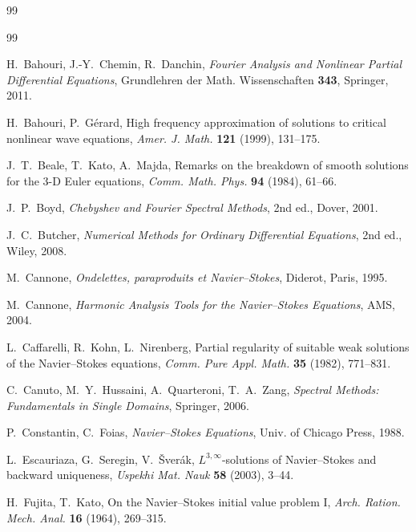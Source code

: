 \IfFileExists{nyjm.cls}{\documentclass[11pt]{nyjm}}{\documentclass[11pt]{amsart}}
\theoremstyle{plain}
\theoremstyle{definition}
\theoremstyle{remark}
\begin{document}
\begin{thebibliography}{99}


\begin{thebibliography}{99}

H.~Bahouri, J.-Y.~Chemin, R.~Danchin,
\emph{Fourier Analysis and Nonlinear Partial Differential Equations},
Grundlehren der Math. Wissenschaften \textbf{343}, Springer, 2011.

H.~Bahouri, P.~Gérard,
High frequency approximation of solutions to critical nonlinear wave equations,
\emph{Amer. J. Math.} \textbf{121} (1999), 131--175.

J.~T.~Beale, T.~Kato, A.~Majda,
Remarks on the breakdown of smooth solutions for the 3-D Euler equations,
\emph{Comm. Math. Phys.} \textbf{94} (1984), 61--66.

J.~P.~Boyd,
\emph{Chebyshev and Fourier Spectral Methods}, 2nd ed.,
Dover, 2001.

J.~C.~Butcher,
\emph{Numerical Methods for Ordinary Differential Equations}, 2nd ed.,
Wiley, 2008.

M.~Cannone,
\emph{Ondelettes, paraproduits et Navier--Stokes},
Diderot, Paris, 1995.

M.~Cannone,
\emph{Harmonic Analysis Tools for the Navier--Stokes Equations},
AMS, 2004.

L.~Caffarelli, R.~Kohn, L.~Nirenberg,
Partial regularity of suitable weak solutions of the Navier--Stokes equations,
\emph{Comm. Pure Appl. Math.} \textbf{35} (1982), 771--831.

C.~Canuto, M.~Y.~Hussaini, A.~Quarteroni, T.~A.~Zang,
\emph{Spectral Methods: Fundamentals in Single Domains},
Springer, 2006.

P.~Constantin, C.~Foias,
\emph{Navier--Stokes Equations},
Univ. of Chicago Press, 1988.

L.~Escauriaza, G.~Seregin, V.~\v{S}ver\'ak,
$L^{3,\infty}$-solutions of Navier--Stokes and backward uniqueness,
\emph{Uspekhi Mat. Nauk} \textbf{58} (2003), 3--44.

H.~Fujita, T.~Kato,
On the Navier--Stokes initial value problem I,
\emph{Arch. Ration. Mech. Anal.} \textbf{16} (1964), 269--315.


\end{thebibliography}
\end{thebibliography}
\end{document}
